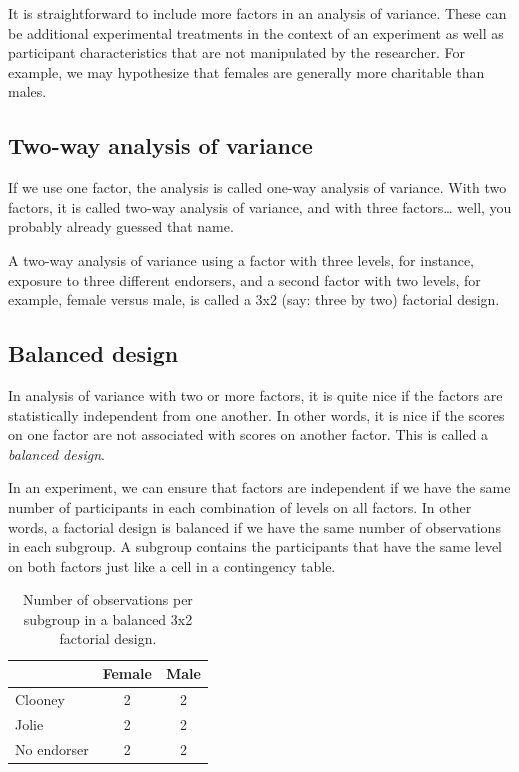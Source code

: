 \documentclass[a4paper]{book}
\theoremstyle{definition}
\theoremstyle{definition}
\theoremstyle{definition}
\theoremstyle{remark}
\begin{document}
It is straightforward to include more factors in an analysis of
variance. These can be additional experimental treatments in the context
of an experiment as well as participant characteristics that are not
manipulated by the researcher. For example, we may hypothesize that
females are generally more charitable than males.

\subsection{Two-way analysis of variance}\label{anova2way}

If we use one factor, the analysis is called one-way analysis of
variance. With two factors, it is called two-way analysis of variance,
and with three factors\ldots{} well, you probably already guessed that
name.

A two-way analysis of variance using a factor with three levels, for
instance, exposure to three different endorsers, and a second factor
with two levels, for example, female versus male, is called a 3x2 (say:
three by two) factorial design.

\subsection{Balanced design}\label{balanced}

In analysis of variance with two or more factors, it is quite nice if
the factors are statistically independent from one another. In other
words, it is nice if the scores on one factor are not associated with
scores on another factor. This is called a \emph{balanced design}.

In an experiment, we can ensure that factors are independent if we have
the same number of participants in each combination of levels on all
factors. In other words, a factorial design is balanced if we have the
same number of observations in each subgroup. A subgroup contains the
participants that have the same level on both factors just like a cell
in a contingency table.

\begin{table}

\caption{\label{tab:anova-balanced}Number of observations per subgroup in a balanced 3x2 factorial design.}
\centering
\fontsize{8}{8}\selectfont
\begin{tabular}[t]{lcc}
\hline
  & Female & Male\\
\hline
Clooney & 2 & 2\\
Jolie & 2 & 2\\
No endorser & 2 & 2\\
\hline
\end{tabular}
\end{table}
\end{document}

